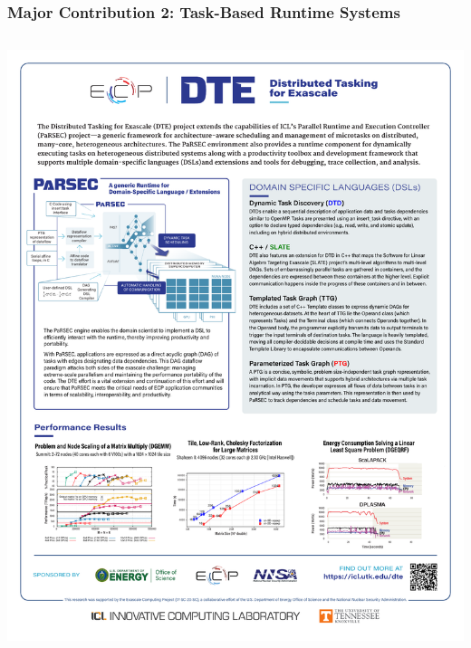 \begin{frame}
  \frametitle{Major Contribution 2: Task-Based Runtime Systems}

  \begin{columns}
    \begin{column}{.4\textwidth}
      \begin{minipage}{\linewidth}
        \begin{center}
          \includegraphics[width=.9\linewidth]{../parsec.pdf}
          

\end{center}
\end{minipage}
\end{column}
\end{columns}
\end{frame}
